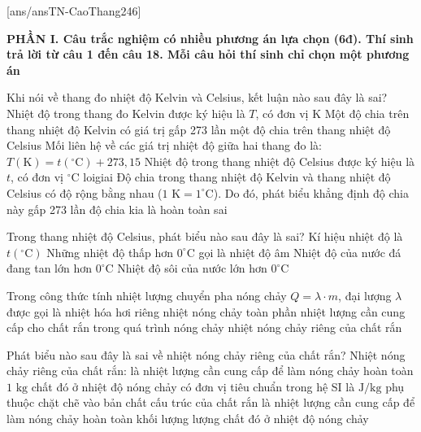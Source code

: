 [ans/ansTN-CaoThang246]

\noindent \textbf{PHẦN I. Câu trắc nghiệm có nhiều phương án lựa chọn (6đ). Thí sinh trả lời từ câu 1 đến câu 18. Mỗi câu hỏi thí sinh chỉ chọn một phương án}
\vspace{0.2cm}

\begin{ex}	Khi nói về thang đo nhiệt độ Kelvin và Celsius, kết luận nào sau đây là sai?
	\choice
	{Nhiệt độ trong thang đo Kelvin được ký hiệu là $T$, có đơn vị K}
	{\True Một độ chia trên thang nhiệt độ Kelvin có giá trị gấp 273 lần một độ chia trên thang nhiệt độ Celsius}
	{Mối liên hệ về các giá trị nhiệt độ giữa hai thang đo là: $T(\text{K})=t(^\circ\text{C})+273,15$}
	{Nhiệt độ trong thang nhiệt độ Celsius được ký hiệu là $t$, có đơn vị $^\circ\text{C}$}
	loigiai{
		Độ chia trong thang nhiệt độ Kelvin và thang nhiệt độ Celsius có độ rộng bằng nhau ($1\text{ K} = 1^\circ\text{C}$). Do đó, phát biểu khẳng định độ chia này gấp 273 lần độ chia kia là hoàn toàn sai}
\end{ex}

\begin{ex}	Trong thang nhiệt độ Celsius, phát biểu nào sau đây là sai?
	\choice
	{Kí hiệu nhiệt độ là $t(^\circ\text{C})$}
	{Những nhiệt độ thấp hơn $0^\circ\text{C}$ gọi là nhiệt độ âm}
	{\True Nhiệt độ của nước đá đang tan lớn hơn $0^\circ\text{C}$}
	{Nhiệt độ sôi của nước lớn hơn $0^\circ\text{C}$}
\end{ex}

\begin{ex}	Trong công thức tính nhiệt lượng chuyển pha nóng chảy $Q = \lambda \cdot m$, đại lượng $\lambda$ được gọi là
	\choice
	{nhiệt hóa hơi riêng}
	{nhiệt nóng chảy toàn phần}
	{nhiệt lượng cần cung cấp cho chất rắn trong quá trình nóng chảy}
	{\True nhiệt nóng chảy riêng của chất rắn}
\end{ex}

\begin{ex}	Phát biểu nào sau đây là sai về nhiệt nóng chảy riêng của chất rắn? Nhiệt nóng chảy riêng của chất rắn:
	\choice
	{là nhiệt lượng cần cung cấp để làm nóng chảy hoàn toàn $1\text{ kg}$ chất đó ở nhiệt độ nóng chảy}
	{có đơn vị tiêu chuẩn trong hệ SI là $\text{J/kg}$}
	{phụ thuộc chặt chẽ vào bản chất cấu trúc của chất rắn}
	{\True là nhiệt lượng cần cung cấp để làm nóng chảy hoàn toàn khối lượng lượng chất đó ở nhiệt độ nóng chảy}
\end{ex}

